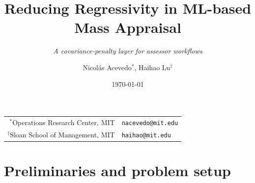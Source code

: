 \documentclass[aspectratio=169,12pt,]{beamer}
\title[Reducing Regressivity in ML: Mass Appraisal]{\color{white} Reducing Regressivity in ML-based Mass Appraisal}
\subtitle{\color{white} \textit{A covariance-penalty layer for assessor workflows}}
\author{Nicol\'as Acevedo$^*$, Haihao Lu$^{\dagger}$}
\date{\today}
\newcommand{\1}{\mathbf{1}}
\begin{document}
\begin{frame}
  \titlepage
  \vspace{-2mm}
  \begin{center}\footnotesize
  \begin{tabular}{r|l}
  $^*$Operations Research Center, MIT & \texttt{nacevedo@mit.edu} \\
  $^\dagger$Sloan School of Management, MIT & \texttt{haihao@mit.edu}
  \end{tabular}
  \end{center}
  \vspace{2mm}
  \begin{center}
  \end{center}
\end{frame}


\section{Preliminaries and problem setup}










\end{document}
